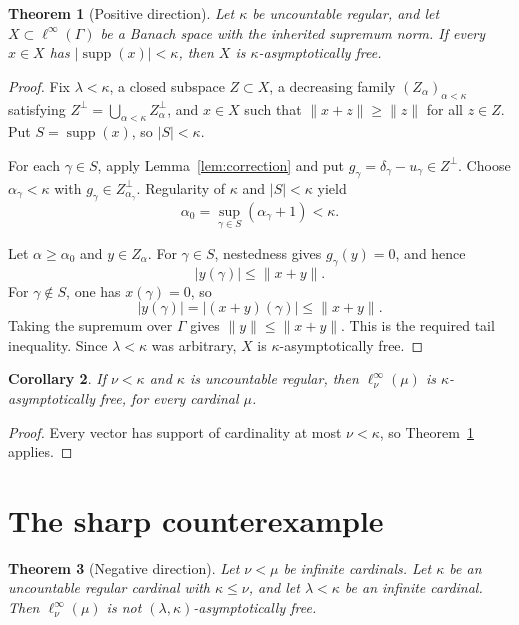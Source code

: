 \documentclass[11pt]{article}
\newtheorem{theorem}{Theorem}
\newtheorem{corollary}[theorem]{Corollary}
\theoremstyle{remark}
\newcommand{\supp}{\operatorname{supp}}
\begin{document}
\begin{theorem}[Positive direction]
\label{thm:positive}
Let \(\kappa\) be uncountable regular, and let
\(X\subset\ell^\infty(\Gamma)\) be a Banach space with the inherited
supremum norm.  If every \(x\in X\) has
\(|\supp(x)|<\kappa\), then \(X\) is \(\kappa\)-asymptotically free.
\end{theorem}

\begin{proof}
Fix \(\lambda<\kappa\), a closed subspace \(Z\subset X\), a decreasing
family \((Z_\alpha)_{\alpha<\kappa}\) satisfying
\(Z^\perp=\bigcup_{\alpha<\kappa}Z_\alpha^\perp\), and \(x\in X\) such
that \(\|x+z\|\geq\|z\|\) for all \(z\in Z\).  Put
\(S=\supp(x)\), so \(|S|<\kappa\).

For each \(\gamma\in S\), apply Lemma~\ref{lem:correction} and put
\(g_\gamma=\delta_\gamma-u_\gamma\in Z^\perp\).  Choose
\(\alpha_\gamma<\kappa\) with
\(g_\gamma\in Z_{\alpha_\gamma}^\perp\).  Regularity of \(\kappa\) and
\(|S|<\kappa\) yield
\[
 \alpha_0=\sup_{\gamma\in S}(\alpha_\gamma+1)<\kappa.
\]

Let \(\alpha\geq\alpha_0\) and \(y\in Z_\alpha\).  For
\(\gamma\in S\), nestedness gives \(g_\gamma(y)=0\), and hence
\[
 |y(\gamma)|\leq\|x+y\|.
\]
For \(\gamma\notin S\), one has \(x(\gamma)=0\), so
\[
 |y(\gamma)|=|(x+y)(\gamma)|\leq\|x+y\|.
\]
Taking the supremum over \(\Gamma\) gives
\(\|y\|\leq\|x+y\|\).  This is the required tail inequality.  Since
\(\lambda<\kappa\) was arbitrary, \(X\) is \(\kappa\)-asymptotically
free.
\end{proof}

\begin{corollary}
\label{cor:upper}
If \(\nu<\kappa\) and \(\kappa\) is uncountable regular, then
\(\ell_\nu^\infty(\mu)\) is \(\kappa\)-asymptotically free, for every
cardinal \(\mu\).
\end{corollary}

\begin{proof}
Every vector has support of cardinality at most \(\nu<\kappa\), so
Theorem~\ref{thm:positive} applies.
\end{proof}

\section{The sharp counterexample}

\begin{theorem}[Negative direction]
\label{thm:negative}
Let \(\nu<\mu\) be infinite cardinals.  Let \(\kappa\) be an uncountable
regular cardinal with \(\kappa\leq\nu\), and let \(\lambda<\kappa\) be an
infinite cardinal.  Then \(\ell_\nu^\infty(\mu)\) is not
\((\lambda,\kappa)\)-asymptotically free.
\end{theorem}
\end{document}
